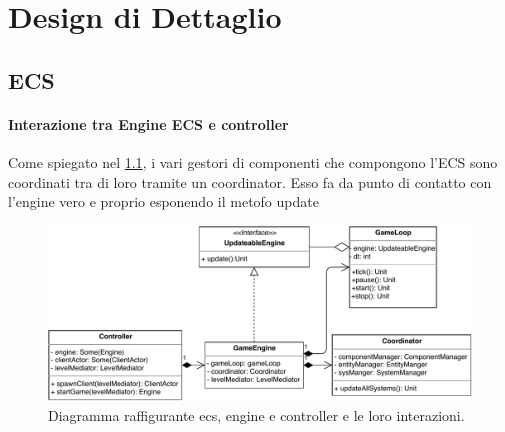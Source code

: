 \chapter{Design di Dettaglio}
\section{ECS}
\label{sec:ecs}


 \subsubsection{Interazione tra Engine ECS e controller}
 Come spiegato nel \ref{sec:ecs}, i vari gestori di componenti che compongono l'ECS sono coordinati tra di loro tramite un coordinator. Esso fa da punto di contatto con l'engine vero e proprio esponendo il metofo update
 \begin{figure}[H]
	\centering
	\includegraphics[width=\columnwidth]{drawio/ECS-engine-controller/ecs-engine-controller.pdf}
	\caption{Diagramma raffigurante ecs, engine e controller e le loro interazioni.}
	\label{fig:ecsenginecontroller}
\end{figure}
